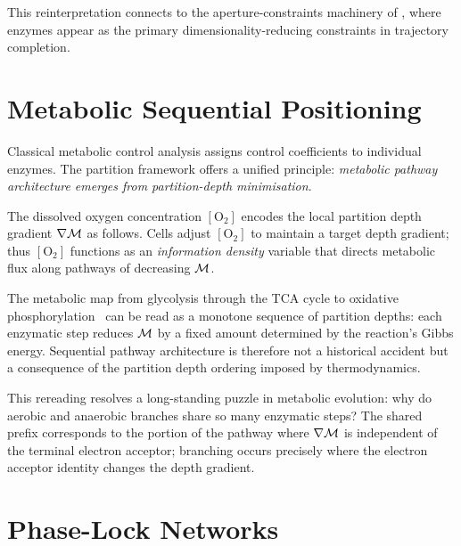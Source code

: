 This reinterpretation connects to the aperture-constraints machinery of
, where enzymes appear as the primary dimensionality-reducing
constraints in trajectory completion.

\section{Metabolic Sequential Positioning}
\label{sec:metabolic-positioning}

Classical metabolic control analysis assigns control coefficients to individual
enzymes.  The partition framework offers a unified principle: \emph{metabolic
pathway architecture emerges from partition-depth minimisation}.

\begin{proposition}
\label{prop:oxygen}
The dissolved oxygen concentration $[\mathrm{O}_2]$ encodes the local partition
depth gradient $\nabla\mathcal{M}$ as follows.  Cells adjust $[\mathrm{O}_2]$ to
maintain a target depth gradient; thus $[\mathrm{O}_2]$ functions as an
\emph{information density} variable that directs metabolic flux along pathways
of decreasing $\mathcal{M}$.
\end{proposition}

The metabolic map from glycolysis through the TCA cycle to oxidative
phosphorylation~\citep{Mitchell1961,boyer1997} can be read as a monotone sequence of partition depths:
each enzymatic step reduces $\mathcal{M}$ by a fixed amount determined by the
reaction's Gibbs energy.  Sequential pathway architecture is therefore not a
historical accident but a consequence of the partition depth ordering imposed by
thermodynamics.

\begin{remark}
This rereading resolves a long-standing puzzle in metabolic evolution: why do
aerobic and anaerobic branches share so many enzymatic steps?  The shared prefix
corresponds to the portion of the pathway where $\nabla\mathcal{M}$ is independent of
the terminal electron acceptor; branching occurs precisely where the electron
acceptor identity changes the depth gradient.
\end{remark}

\section{Phase-Lock Networks}
\label{sec:phase-lock}

